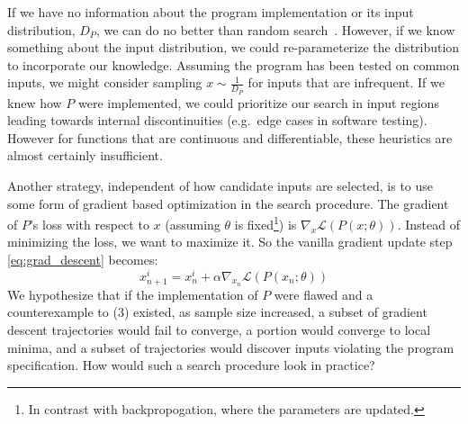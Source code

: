 \documentclass[12pt,initial,twoside,maitrise]{dms}
\numberwithin{equation}{section}
\numberwithin{table}{chapter}
\numberwithin{figure}{chapter}
\begin{document}
If we have no information about the program implementation or its input distribution, $D_P$, we can do no better than random search~\cite{wolpert1997no}. However, if we know something about the input distribution, we could re-parameterize the distribution to incorporate our knowledge. Assuming the program has been tested on common inputs, we might consider sampling $x \sim \frac{1}{D_P}$ for inputs that are infrequent. If we knew how $P$ were implemented, we could prioritize our search in input regions leading towards internal discontinuities (e.g.\ edge cases in software testing). However for functions that are continuous and differentiable, these heuristics are almost certainly insufficient.


Another strategy, independent of how candidate inputs are selected, is to use some form of gradient based optimization in the search procedure. The gradient of $P$'s loss with respect to $x$ (assuming $\theta$ is fixed\footnote{In contrast with backpropogation, where the parameters are updated.}) is $\nabla_x \mathcal{L}(P(x; \theta))$. Instead of minimizing the loss, we want to maximize it. So the vanilla gradient update step \ref{eq:grad_descent} becomes:
%
\begin{equation}
    x_{n+1}^i = x_{n}^i + \alpha \nabla_{x_n} \mathcal{L}(P(x_n; \theta))
\end{equation}
%
We hypothesize that if the implementation of $P$ were flawed and a counterexample to (3) existed, as sample size increased, a subset of gradient descent trajectories would fail to converge, a portion would converge to local minima, and a subset of trajectories would discover inputs violating the program specification. How would such a search procedure look in practice?

%
%
\end{document}
